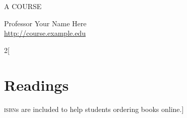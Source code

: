 \documentclass[12pt,twoside]{article}
\begin{document}
%

{\large
    \uppercase{A Course}
}

\begin{flushleft}
Professor Your Name Here \\
\url{http://course.example.edu}
\end{flushleft}








\nocite{*}

\begin{multicols}{2}[%
    \section{Readings} \textsc{isbn}s are included to help students ordering books online.]
\printbibliography[notkeyword=supplemental,heading=none]
\end{multicols}



\vfill
\footnotesize

\end{document}
